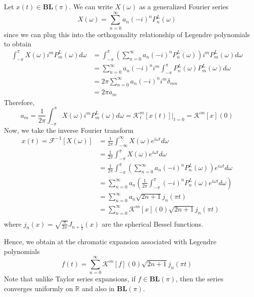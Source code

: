 \documentclass[11pt]{article} %
\theoremstyle{plain}
\theoremstyle{definition}
\theoremstyle{remark}
\begin{document}
Let $x(t) \in \mathbf{BL}(\pi)$. We can write $X(\omega)$ as a generalized Fourier series
\begin{equation*}
  X(\omega) = \sum_{n=0}^{\infty} a_n (-i)^n P_n^L(\omega)
\end{equation*}
since we can plug this into the orthogonality relationship of Legendre polynomials to obtain
\begin{align*}
  \int_{-\pi}^{\pi} X(\omega) i^m P_m^L(\omega) d\omega 
    &= \int_{-\pi}^{\pi} \left ( \sum_{n=0}^{\infty} a_n (-i)^n P_n^L(\omega) \right ) i^m P_m^L(\omega) d\omega \\
    &= \sum_{n=0}^{\infty} a_n (-i)^n  i^m \int_{-\pi}^{\pi} P_n^L(\omega) P_m^L(\omega) d\omega \\
    &= 2 \pi \sum_{n=0}^{\infty} a_n (-i)^n  i^m \delta_{mn} \\
    &= 2 \pi a_m
\end{align*}
Therefore, 
\begin{equation*}
  a_m = \frac{1}{2\pi} \int_{-\pi}^{\pi} X(\omega) i^m P_m^L(\omega) d\omega 
      = \mathcal{K}_t^m[x(t)] |_{t=0} = \mathcal{K}^m[x](0)
\end{equation*}
Now, we take the inverse Fourier transform
\begin{align*}
  x(t) = \mathcal{F}^{-1}[X(\omega)] 
      &= \frac{1}{2 \pi} \int_{-\infty}^{\infty} X(\omega) e^{i \omega t} d\omega \\
      &= \frac{1}{2 \pi} \int_{-\pi}^{\pi} X(\omega) e^{i \omega t} d\omega \\
      &= \frac{1}{2 \pi} \int_{-\pi}^{\pi} \left ( \sum_{n=0}^{\infty} a_n (-i)^n P_n^L(\omega) \right ) e^{i \omega t} d\omega \\
      &= \sum_{n=0}^{\infty} a_n \left ( \frac{1}{2 \pi} \int_{-\pi}^{\pi} (-i)^n P_n^L(\omega) e^{i \omega t} d\omega \right ) \\
      &= \sum_{n=0}^{\infty} a_n \sqrt{2n+1} j_n(\pi t) \\
      &= \sum_{n=0}^{\infty} \mathcal{K}^m[x](0) \sqrt{2n+1} j_n(\pi t) \\
\end{align*}
where $j_n(x) = \sqrt{\frac{\pi}{2x}} J_{n+\frac{1}{2}}(x)$ are the spherical Bessel functions.

Hence, we obtain at the chromatic expansion associated with Legendre polynomials
\begin{equation}
  f(t) = \sum_{n=0}^{\infty} \mathcal{K}^m[f](0) \sqrt{2n+1} j_n(\pi t)
\end{equation}
Note that unlike Taylor series expansions, if $f \in \mathbf{BL}(\pi)$, then the 
series converges uniformly on $\mathbb{R}$ and also in $\mathbf{BL}(\pi)$.
\end{document}
